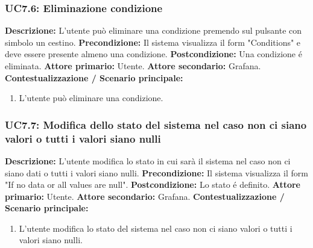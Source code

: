                 
                
                \subsubsection{UC7.6: Eliminazione condizione }
                    \textbf{Descrizione:} L’utente può eliminare una condizione premendo sul pulsante con simbolo un cestino.
                    \newline
                    \textbf{Precondizione:} Il sistema visualizza il form "Conditions" e deve essere presente almeno una condizione.
                    \newline
                    \textbf{Postcondizione:} Una condizione é eliminata.
                    \newline
                    \textbf{Attore primario:} Utente.
                    \newline
                    \textbf{Attore secondario:} Grafana.
                    \newline
                    \textbf{Contestualizzazione / Scenario principale:} \begin{enumerate}
                            \item L'utente può eliminare una condizione.
                        \end{enumerate}
                        
                \subsubsection{UC7.7: Modifica dello stato del sistema nel caso non ci siano valori o tutti i valori siano nulli }
                    \textbf{Descrizione:} L’utente modifica lo stato in cui sarà il sistema nel caso non ci siano dati o tutti i valori siano nulli.
                    \newline
                    \textbf{Precondizione:} Il sistema visualizza il form "If no data or all values are null".
                    \newline
                    \textbf{Postcondizione:} Lo stato é definito.
                    \newline
                    \textbf{Attore primario:} Utente.
                    \newline
                    \textbf{Attore secondario:} Grafana.
                    \newline
                    \textbf{Contestualizzazione / Scenario principale:} \begin{enumerate}
                            \item L'utente modifica lo stato del sistema nel caso non ci siano valori o tutti i valori siano nulli.
                        \end{enumerate}
                        
